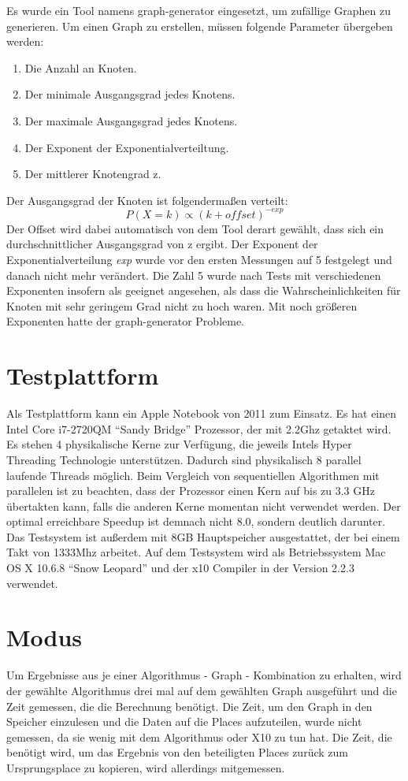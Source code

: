 Es wurde ein Tool namens graph-generator \cite{graph-generator:2009:Online} eingesetzt, um zufällige Graphen zu generieren. Um einen Graph zu erstellen, müssen folgende Parameter übergeben werden:
\begin{enumerate}
	\item Die Anzahl an Knoten.
	\item Der minimale Ausgangsgrad jedes Knotens.
	\item Der maximale Ausgangsgrad jedes Knotens.
	\item Der Exponent der Exponentialverteiltung.
	\item Der mittlerer Knotengrad z.
\end{enumerate}
Der Ausgangsgrad der Knoten ist folgendermaßen verteilt:
$$
P(X=k) \propto (k + offset)^{-exp}
$$
Der Offset wird dabei automatisch von dem Tool derart gewählt, dass sich ein durchschnittlicher Ausgangsgrad von z ergibt. Der Exponent der Exponentialverteilung \textit{exp} wurde vor den ersten Messungen auf 5 festgelegt und danach nicht mehr verändert. Die Zahl 5 wurde nach Tests mit verschiedenen Exponenten insofern als geeignet angesehen, als dass die Wahrscheinlichkeiten für Knoten mit sehr geringem Grad nicht zu hoch waren. Mit noch größeren Exponenten hatte der graph-generator Probleme.

\section{Testplattform} %
\label{sec:testplattform}
Als Testplattform kann ein Apple Notebook von 2011 zum Einsatz. Es hat einen Intel Core i7-2720QM \enquote{Sandy Bridge} Prozessor, der mit 2.2Ghz getaktet wird. Es stehen 4 physikalische Kerne zur Verfügung, die jeweils Intels Hyper Threading Technologie unterstützen. Dadurch sind physikalisch 8 parallel laufende Threads möglich. Beim Vergleich von sequentiellen Algorithmen mit parallelen ist zu beachten, dass der Prozessor einen Kern auf bis zu 3.3 GHz übertakten kann, falls die anderen Kerne momentan nicht verwendet werden. Der optimal erreichbare Speedup ist demnach nicht 8.0, sondern deutlich darunter. Das Testsystem ist außerdem mit 8GB Hauptspeicher ausgestattet, der bei einem Takt von 1333Mhz arbeitet. Auf dem Testsystem wird als Betriebssystem Mac OS X 10.6.8 \enquote{Snow Leopard} und der x10 Compiler in der Version 2.2.3 verwendet.

\section{Modus} %
\label{sec:modus}
Um Ergebnisse aus je einer Algorithmus - Graph - Kombination zu erhalten, wird der gewählte Algorithmus drei mal auf dem gewählten Graph ausgeführt und die Zeit gemessen, die die Berechnung benötigt. Die Zeit, um den Graph in den Speicher einzulesen und die Daten auf die Places aufzuteilen, wurde nicht gemessen, da sie wenig mit dem Algorithmus oder X10 zu tun hat. Die Zeit, die benötigt wird, um das Ergebnis von den beteiligten Places zurück zum Ursprungsplace zu kopieren, wird allerdings mitgemessen.

